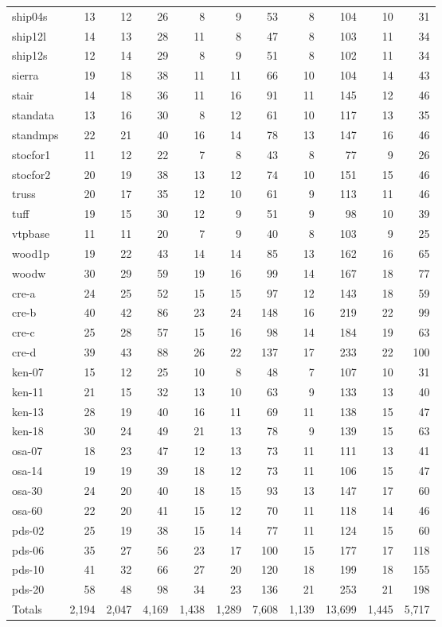 \begin{small}
\begin{longtable}{|l|r|rr||r|rr||rr||rr|}
ship04s  & 13 & 12 & 26  & 8 & 9 & 53 & 8 & 104 & 10 & 31 \\
ship12l  & 14 & 13 & 28  & 11 & 8 & 47 & 8 & 103 & 11 & 34 \\
ship12s  & 12 & 14 & 29  & 8 & 9 & 51 & 8 & 102 & 11 & 34 \\
sierra   & 19 & 18 & 38  & 11 & 11 & 66 & 10 & 104 & 14 & 43 \\
stair    & 14 & 18 & 36  & 11 & 16 & 91 & 11 & 145 & 12 & 46 \\
standata & 13 & 16 & 30  & 8 & 12 & 61 & 10 & 117 & 13 & 35 \\
standmps & 22 & 21 & 40  & 16 & 14 & 78 & 13 & 147 & 16 & 46 \\
stocfor1 & 11 & 12 & 22  & 7 & 8 & 43 & 8 & 77 & 9 & 26 \\
stocfor2 & 20 & 19 & 38  & 13 & 12 & 74 & 10 & 151 & 15 & 46 \\
truss    & 20 & 17 & 35  & 12 & 10 & 61 & 9 & 113 & 11 & 46 \\
tuff     & 19 & 15 & 30  & 12 & 9 & 51 & 9 & 98 & 10 & 39 \\
vtpbase  & 11 & 11 & 20  & 7 & 9 & 40 & 8 & 103 & 9 & 25 \\
wood1p   & 19 & 22 & 43  & 14 & 14 & 85 & 13 & 162 & 16 & 65 \\
woodw    & 30 & 29 & 59  & 19 & 16 & 99 & 14 & 167 & 18 & 77 \\
cre-a    & 24 & 25 & 52  & 15 & 15 & 97 & 12 & 143 & 18 & 59 \\
cre-b    & 40 & 42 & 86  & 23 & 24 & 148 & 16 & 219 & 22 & 99 \\
cre-c    & 25 & 28 & 57  & 15 & 16 & 98 & 14 & 184 & 19 & 63 \\
cre-d    & 39 & 43 & 88  & 26 & 22 & 137 & 17 & 233 & 22 & 100 \\
ken-07   & 15 & 12 & 25  & 10 & 8 & 48 & 7 & 107 & 10 & 31 \\
ken-11   & 21 & 15 & 32  & 13 & 10 & 63 & 9 & 133 & 13 & 40 \\
ken-13   & 28 & 19 & 40  & 16 & 11 & 69 & 11 & 138 & 15 & 47 \\
ken-18   & 30 & 24 & 49  & 21 & 13 & 78 & 9 & 139 & 15 & 63 \\
osa-07   & 18 & 23 & 47  & 12 & 13 & 73 & 11 & 111 & 13 & 41 \\
osa-14   & 19 & 19 & 39  & 18 & 12 & 73 & 11 & 106 & 15 & 47 \\
osa-30   & 24 & 20 & 40  & 18 & 15 & 93 & 13 & 147 & 17 & 60 \\
osa-60   & 22 & 20 & 41  & 15 & 12 & 70 & 11 & 118 & 14 & 46 \\
pds-02   & 25 & 19 & 38  & 15 & 14 & 77 & 11 & 124 & 15 & 60 \\
pds-06   & 35 & 27 & 56  & 23 & 17 & 100 & 15 & 177 & 17 & 118 \\
pds-10   & 41 & 32 & 66 & 27 & 20 & 120 & 18 & 199 & 18 & 155 \\
pds-20   & 58 & 48 & 98 & 34 & 23 & 136 & 21 & 253 & 21 & 198 \\ \hline
Totals & 2,194& 2,047& 4,169& 1,438& 1,289& 7,608& 1,139& 13,699& 1,445& 5,717
\end{longtable} 
\end{small}


